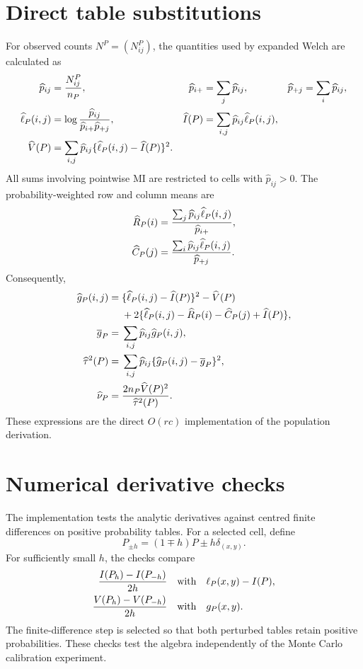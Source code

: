 \section{Direct table substitutions}

For observed counts $N^P=(N^P_{ij})$, the quantities used by expanded
Welch are calculated as
\begin{align}
  \widehat p_{ij}&=\frac{N^P_{ij}}{n_P},
  &\widehat p_{i+}&=\sum_j\widehat p_{ij},
  &\widehat p_{+j}&=\sum_i\widehat p_{ij},\\
  \widehat{\ell}_P(i,j)
  &=\log\frac{\widehat p_{ij}}
  {\widehat p_{i+}\widehat p_{+j}},
  &\widehat I(P)&=\sum_{i,j}\widehat p_{ij}\widehat{\ell}_P(i,j),\\
  \widehat V(P)&=\sum_{i,j}\widehat p_{ij}
  \{\widehat{\ell}_P(i,j)-\widehat I(P)\}^2.
\end{align}
All sums involving pointwise MI are restricted to cells with
$\widehat p_{ij}>0$. The probability-weighted row and column means are
\begin{align}
  \widehat R_P(i)
  &=\frac{\sum_j\widehat p_{ij}\widehat{\ell}_P(i,j)}
          {\widehat p_{i+}},\\
  \widehat C_P(j)
  &=\frac{\sum_i\widehat p_{ij}\widehat{\ell}_P(i,j)}
          {\widehat p_{+j}}.
\end{align}
Consequently,
\begin{align}
  \widehat g_P(i,j)
  ={}&\{\widehat{\ell}_P(i,j)-\widehat I(P)\}^2-\widehat V(P)\\
  &+2\{\widehat{\ell}_P(i,j)-\widehat R_P(i)
  -\widehat C_P(j)+\widehat I(P)\},\\
  \overline g_P
  ={}&\sum_{i,j}\widehat p_{ij}\widehat g_P(i,j),\\
  \widehat\tau^2(P)
  ={}&\sum_{i,j}\widehat p_{ij}
  \{\widehat g_P(i,j)-\overline g_P\}^2,\\
  \widehat\nu_P
  ={}&\frac{2n_P\widehat V(P)^2}{\widehat\tau^2(P)}.
\end{align}
These expressions are the direct $O(rc)$ implementation of the population
derivation.

\section{Numerical derivative checks}

The implementation tests the analytic derivatives against centred finite
differences on positive probability tables. For a selected cell, define
\begin{equation}
  P_{\pm h}=(1\mp h)P\pm h\delta_{(x,y)}.
\end{equation}
For sufficiently small $h$, the checks compare
\begin{align}
  \frac{I(P_h)-I(P_{-h})}{2h}
  &\quad\text{with}\quad \ell_P(x,y)-I(P),\\
  \frac{V(P_h)-V(P_{-h})}{2h}
  &\quad\text{with}\quad g_P(x,y).
\end{align}
The finite-difference step is selected so that both perturbed tables retain
positive probabilities. These checks test the algebra independently of the
Monte Carlo calibration experiment.
